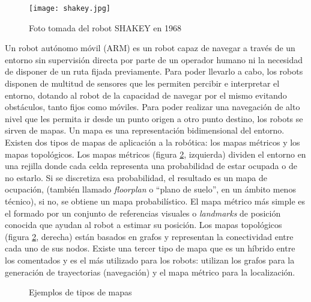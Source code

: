 \begin{figure}[h]
	\begin{center} 
	\texttt{[image: shakey.jpg]}
	\end{center}
	\caption{Foto tomada del robot SHAKEY en 1968 \cite{shakey2}}
	\label{fig:shakey}
\end{figure}


Un robot autónomo móvil (ARM) es un robot capaz de navegar a través de un entorno sin supervisión directa por parte de un operador humano ni la necesidad de disponer de un ruta fijada previamente. Para poder llevarlo a cabo, los robots disponen de multitud de sensores que les permiten percibir e interpretar el entorno, dotando al robot de la capacidad de navegar por el mismo evitando obstáculos, tanto fijos como móviles. Para poder realizar una navegación de alto nivel que les permita ir desde un punto origen a otro punto destino, los robots se sirven de mapas. Un mapa es una representación bidimensional del entorno. Existen dos tipos de mapas de aplicación a la robótica: los mapas métricos y los mapas topológicos. Los mapas métricos (figura \ref{fig:mapas}, izquierda) dividen el entorno en una rejilla donde cada celda representa una probabilidad de estar ocupada o de no estarlo. Si se discretiza esa probabilidad, el resultado es un mapa de ocupación, (también llamado \textit{floorplan} o ``plano de suelo'', en un ámbito menos técnico), si no, se obtiene un mapa probabilístico. El mapa métrico más simple es el formado por un conjunto de referencias visuales o \textit{landmarks} de posición conocida que ayudan al robot a estimar su posición. Los mapas topológicos (figura \ref{fig:mapas}, derecha) están basados en grafos y representan la conectividad entre cada uno de sus nodos. Existe una tercer tipo de mapa que es un híbrido entre los comentados y es el más utilizado para los robots: utilizan los grafos para la generación de trayectorias (navegación) y el mapa métrico para la localización.\\

\begin{figure}[H]
 \centering
  \hspace{2cm}
 \caption{Ejemplos de tipos de mapas}
 \label{fig:mapas}
\end{figure}

